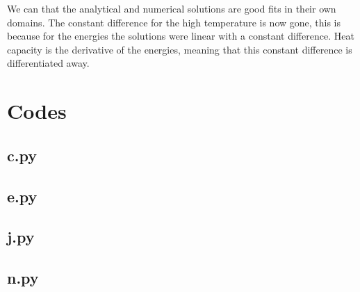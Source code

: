 \documentclass[a4paper,norsk, 10pt]{article}
\begin{document}
We can that the analytical and numerical solutions are good fits in their own domains. The constant difference for the high temperature is now gone, this is because for the energies the solutions were linear with a constant difference. Heat capacity is the derivative of the energies, meaning that this constant difference is differentiated away.

\section{Codes}
\subsection{c.py}\label{sec:codeC}


\subsection{e.py}\label{sec:codeE}


\subsection{j.py}\label{sec:codeJ}


\subsection{n.py}\label{sec:codeN}

\end{document}
